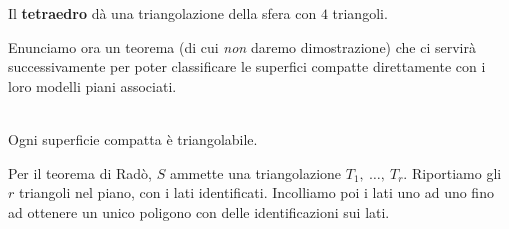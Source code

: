 \begin{example}
	Il \textbf{tetraedro} dà una triangolazione della sfera con $4$ triangoli.
\end{example}
Enunciamo ora un teorema (di cui \textit{non} daremo dimostrazione) che ci servirà successivamente per poter classificare le superfici compatte direttamente con i loro modelli piani associati.
\begin{theorema}~{}\\
	Ogni superficie compatta è triangolabile.
\end{theorema}
\begin{corollary}
\end{corollary}
\begin{demonstration}
	Per il teorema di Radò, $S$ ammette una triangolazione $T_1,\ \ldots,\ T_r$. Riportiamo gli $r$ triangoli nel piano, con i lati identificati. Incolliamo poi i lati uno ad uno fino ad ottenere un unico poligono con delle identificazioni sui lati.
\end{demonstration}
